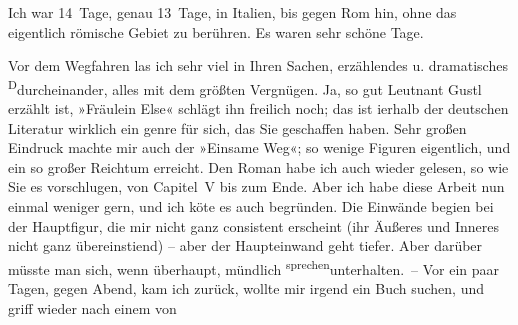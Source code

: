 \pstart
           Ich war 14 Tage, genau 13 Tage, in Italien, bis
               gegen Rom hin, ohne das eigentlich römische Gebiet zu berühren. Es waren sehr schöne
               Tage.\pend
           
\pstart
           Vor dem Wegfahren las ich sehr viel in Ihren Sachen, erzählendes u. dramatisches \substVorne{}\textsuperscript{D}\substDazwischen{}d\substHinten{}urcheinander, alles mit dem größten Vergnügen. Ja, so gut Leutnant Gustl erzählt ist, »Fräulein Else« schlägt ihn freilich noch; das ist i{\geminationn}erhalb der deutschen Literatur wirklich ein genre für
               sich, das Sie geschaffen haben. Sehr großen Eindruck machte mir auch der »Einsame Weg«; so wenige Figuren eigentlich, und
               ein so großer Reichtum erreicht. Den Roman habe ich {\pb}auch wieder gelesen, so wie Sie es
               vorschlugen, von Capitel V bis zum Ende. Aber ich habe diese Arbeit nun einmal
               weniger gern, und ich kö{\geminationn}te es auch begründen. Die
               Einwände begi{\geminationn}en bei der Hauptfigur, die mir nicht ganz
               consistent erscheint (ihr Äußeres und Inneres nicht ganz übereinsti{\geminationm}end) – aber der Haupteinwand geht tiefer. Aber darüber
               müsste man sich, wenn überhaupt, mündlich \substVorne{}\textsuperscript{sprechen}\substDazwischen{}unterhalten\substHinten{}. – Vor ein paar Tagen, gegen Abend, kam ich zurück, wollte \introOben{}mir\introOben{} irgend ein Buch suchen, und griff wieder nach einem von
